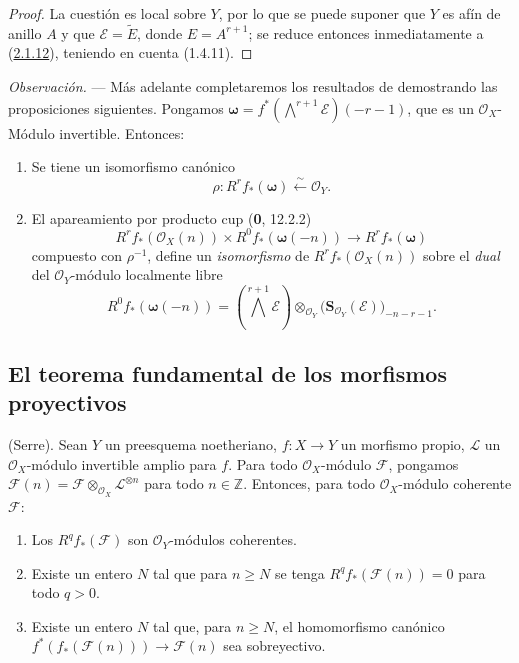 \begin{proof}
La cuestión es local sobre $Y$, por lo que se puede suponer que $Y$ es afín de anillo $A$ y que $\mathcal E=\widetilde E$, donde $E=A^{r+1}$; se reduce entonces inmediatamente a (\hyperref[III.2.1.12-fr]{2.1.12}), teniendo en cuenta (1.4.11).
\end{proof}

\begin{env}[2.1.16]
\label{III.2.1.16}
\label{III.2.1.16-fr}
\emph{Observación.} ---
Más adelante completaremos los resultados de  demostrando las proposiciones siguientes.
Pongamos
$\boldsymbol\omega=f^*(\bigwedge^{r+1}\mathcal E)(-r-1)$,
que es un $\mathcal O_X$-Módulo invertible. Entonces:
\begin{enumerate}
\item[{\rm(i)}] Se tiene un isomorfismo canónico
\begin{equation}
\label{III.2.1.16.1-fr}
\tag{2.1.16.1}
\rho:R^rf_*(\boldsymbol\omega)\xleftarrow{\sim}\mathcal O_Y.
\end{equation}
\item[{\rm(ii)}] El apareamiento por producto cup (\textbf{0}, 12.2.2)
\begin{equation}
\label{III.2.1.16.2-fr}
\tag{2.1.16.2}
R^rf_*(\mathcal O_X(n))\times R^0f_*(\boldsymbol\omega(-n))
\longrightarrow R^rf_*(\boldsymbol\omega)
\end{equation}
  compuesto con $\rho^{-1}$, define un \emph{isomorfismo} de $R^rf_*(\mathcal O_X(n))$ sobre el \emph{dual} del $\mathcal O_Y$-módulo localmente libre
  \[
R^0f_*(\boldsymbol\omega(-n))
=\left(\bigwedge^{r+1}\mathcal E\right)
\otimes_{\mathcal O_Y}\bigl(\mathbf S_{\mathcal O_Y}(\mathcal E)\bigr)_{-n-r-1}.
\]
\end{enumerate}
\end{env}

\subsection{El teorema fundamental de los morfismos proyectivos}
\label{subsection:III.2.2}
\label{subsection:III.2.2-fr}

\begin{theorem}[2.2.1]
\label{III.2.2.1-fr}
(Serre). Sean $Y$ un preesquema noetheriano, $f:X\to Y$ un morfismo propio, $\mathcal L$ un $\mathcal O_X$-módulo invertible amplio para $f$. Para todo $\mathcal O_X$-módulo $\mathcal F$, pongamos
$\mathcal F(n)=\mathcal F\otimes_{\mathcal O_X}\mathcal L^{\otimes n}$
para todo $n\in\mathbb Z$. Entonces, para todo $\mathcal O_X$-módulo coherente $\mathcal F$:
\begin{enumerate}
\item[{\rm(i)}] Los $R^qf_*(\mathcal F)$ son $\mathcal O_Y$-módulos coherentes.
\item[{\rm(ii)}] Existe un entero $N$ tal que para $n\geq N$ se tenga $R^qf_*(\mathcal F(n))=0$ para todo $q>0$.
\item[{\rm(iii)}] Existe un entero $N$ tal que, para $n\geq N$, el homomorfismo canónico
$f^*(f_*(\mathcal F(n)))\longrightarrow\mathcal F(n)$
sea sobreyectivo.
\end{enumerate}
\end{theorem}

